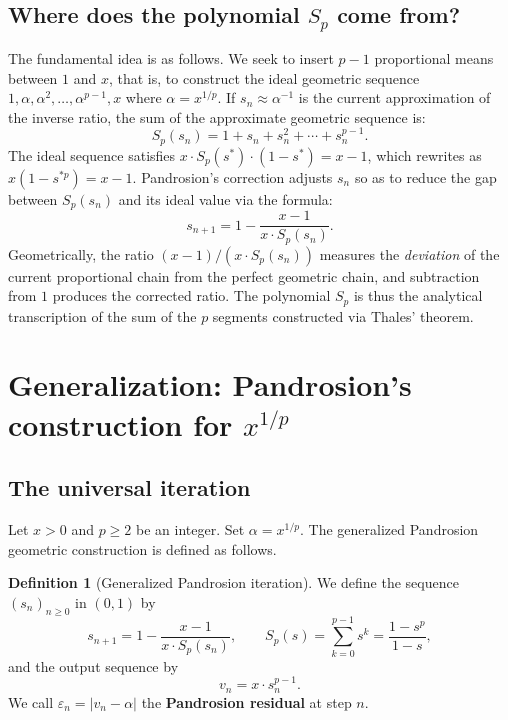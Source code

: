 \documentclass[11pt,a4paper]{article}
\theoremstyle{definition}
\newtheorem{definition}{Definition}[section]
\newcommand{\eps}{\varepsilon}
\begin{document}
\subsection{Where does the polynomial $S_p$ come from?}

The fundamental idea is as follows. We seek to insert $p-1$ proportional means between $1$ and $x$, that is, to construct the ideal geometric sequence $1, \alpha, \alpha^2, \ldots, \alpha^{p-1}, x$ where $\alpha = x^{1/p}$. If $s_n \approx \alpha^{-1}$ is the current approximation of the inverse ratio, the sum of the approximate geometric sequence is:
\[
  S_p(s_n) = 1 + s_n + s_n^2 + \cdots + s_n^{p-1}.
\]
The ideal sequence satisfies $x \cdot S_p(s^*) \cdot (1-s^*) = x-1$, which rewrites as $x(1-s^{*p}) = x-1$. Pandrosion's correction adjusts $s_n$ so as to reduce the gap between $S_p(s_n)$ and its ideal value via the formula:
\[
  s_{n+1} = 1 - \frac{x-1}{x \cdot S_p(s_n)}.
\]
Geometrically, the ratio $(x-1)/(x \cdot S_p(s_n))$ measures the \emph{deviation} of the current proportional chain from the perfect geometric chain, and subtraction from $1$ produces the corrected ratio. The polynomial $S_p$ is thus the analytical transcription of the sum of the $p$ segments constructed via Thales' theorem.

\section{Generalization: Pandrosion's construction for \texorpdfstring{$x^{1/p}$}{x\^{}(1/p)}}
\label{sec:generalisation}

\subsection{The universal iteration}

Let $x > 0$ and $p \geq 2$ be an integer. Set $\alpha = x^{1/p}$. The generalized Pandrosion geometric construction is defined as follows.

\begin{definition}[Generalized Pandrosion iteration]
\label{def:pandrosion_gen}
We define the sequence $(s_n)_{n \geq 0}$ in $(0, 1)$ by
\begin{equation}
  \label{eq:pandrosion_gen}
  s_{n+1} = 1 - \frac{x - 1}{x \cdot S_p(s_n)},
  \qquad
  S_p(s) = \sum_{k=0}^{p-1} s^k = \frac{1 - s^p}{1 - s},
\end{equation}
and the output sequence by
\begin{equation}
  \label{eq:vn_gen}
  v_n = x \cdot s_n^{p-1}.
\end{equation}
We call $\eps_n = |v_n - \alpha|$ the \textbf{Pandrosion residual} at step $n$.
\end{definition}
\end{document}

